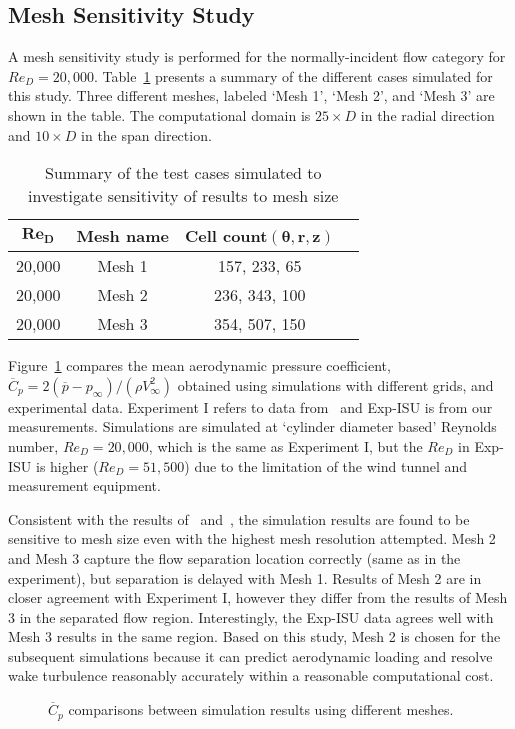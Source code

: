\subsection{Mesh Sensitivity Study}
\label{sec:mesh_sensitivity}
%
A mesh sensitivity study is performed for the normally-incident flow category
for $Re_D=20,000$. Table~\ref{tab:meshSize} presents a summary of the different
cases simulated for this study.  Three different meshes, labeled `Mesh 1',
`Mesh 2', and `Mesh 3' are shown in the table.  The computational domain is
$25\times D$ in the radial direction and $10\times D$ in the span direction.
%
\begin{table}[htb!]
  \caption{Summary of the test cases simulated to investigate sensitivity of results to mesh size} 
  \label{tab:meshSize} 
  \begin{center}
  \begin{tabular}{c|c|c|c}
    $\boldsymbol{Re_D}$ & \textbf{Mesh name} &  \textbf{Cell count}$\boldsymbol{(\theta,r,z)}$ \\ \hline
    \hline
    20,000  & Mesh 1 & 157, 233, 65\\ \hline
    20,000  & Mesh 2 & 236, 343, 100\\ \hline
    20,000  & Mesh 3 & 354, 507, 150\\ \hline \hline
    \hline
  \end{tabular}
  \end{center}
\end {table}

Figure~\ref{fig:Cp_compare_LS_Mesh} compares the mean aerodynamic pressure
coefficient, $\overline{C}_p=2 (\overline{p}-p_\infty)/(\rho V_\infty^2)$
obtained using simulations with different grids, and experimental data.
Experiment I refers to data from~\cite{norberg2013pressure} and Exp-ISU is from
our measurements. Simulations are simulated at `cylinder diameter based'
Reynolds number, $Re_D=20,000$, which is the same as Experiment I, but the
$Re_D$ in Exp-ISU is higher ($Re_D=51,500$) due to the limitation of the wind
tunnel and measurement equipment.

Consistent with the results of~\cite{travin2000detached}
and~\cite{breuer2000challenging}, the simulation results are found to be
sensitive to mesh size even with the highest mesh resolution attempted. Mesh 2
and Mesh 3 capture the flow separation location correctly (same as in the
experiment), but separation is delayed with Mesh 1. Results of Mesh 2 are in
closer agreement with Experiment I, however they differ from the results of
Mesh 3 in the separated flow region. Interestingly, the Exp-ISU data agrees
well with Mesh 3 results in the same region. Based on this study, Mesh 2 is
chosen for the subsequent simulations because it can predict aerodynamic
loading and resolve wake turbulence reasonably accurately within a reasonable
computational cost.
%
\begin{figure}[htb!]
  \centering
  \caption{$\overline{C}_p$ comparisons between simulation results using
  different meshes.}
  \label{fig:Cp_compare_LS_Mesh}
\end{figure}


